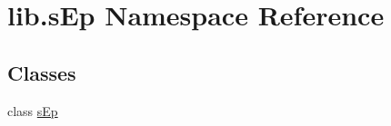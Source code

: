 \hypertarget{namespacelib_1_1s_ep}{\section{lib.\-s\-Ep Namespace Reference}
\label{namespacelib_1_1s_ep}
}
\subsection*{Classes}
\begin{DoxyCompactItemize}
\item 
class \hyperlink{classlib_1_1s_ep_1_1s_ep}{s\-Ep}
\end{DoxyCompactItemize}
